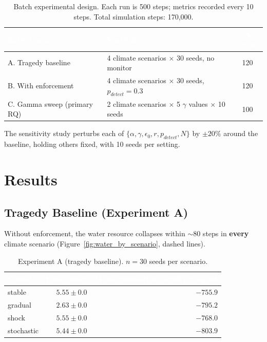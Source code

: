 \documentclass[12pt, a4paper]{article}
\begin{document}
\begin{table}[H]
    \centering
    \renewcommand{\arraystretch}{1.4}
    \small
    \begin{tabular}{|l|p{8cm}|c|}
        \hline
        \rowcolor{nutDark} \textcolor{white}{\textbf{Experiment}} & \textcolor{white}{\textbf{Variables}} & \textcolor{white}{\textbf{N runs}} \\ \hline
        A. Tragedy baseline & 4 climate scenarios $\times$ 30 seeds, no monitor & 120 \\ \hline
        B. With enforcement & 4 climate scenarios $\times$ 30 seeds, $p_{detect}{=}0.3$ & 120 \\ \hline
        C. Gamma sweep (primary RQ) & 2 climate scenarios $\times$ 5 $\gamma$ values $\times$ 10 seeds & 100 \\ \hline
    \end{tabular}
    \caption{Batch experimental design. Each run is 500 steps; metrics recorded every 10 steps. Total simulation steps: 170{,}000.}
\end{table}

The sensitivity study perturbs each of
$\{\alpha, \gamma, \epsilon_0, r, p_{detect}, N\}$ by $\pm 20\%$ around the
baseline, holding others fixed, with 10 seeds per setting.

\section{Results}

\subsection{Tragedy Baseline (Experiment A)}

Without enforcement, the water resource collapses within ${\sim}80$ steps in
\textbf{every} climate scenario (Figure~\ref{fig:water_by_scenario}, dashed
lines).

\begin{table}[H]
    \centering
    \renewcommand{\arraystretch}{1.3}
    \begin{tabular}{|l|r|r|}
        \hline
        \rowcolor{nutDark}
        \textcolor{white}{\textbf{Climate}} &
        \textcolor{white}{\textbf{Final water}} &
        \textcolor{white}{\textbf{Mean cumulative payoff per agent}} \\ \hline
        stable     & $5.55 \pm 0.0$ & $-755.9$ \\ \hline
        gradual    & $2.63 \pm 0.0$ & $-795.2$ \\ \hline
        shock      & $5.55 \pm 0.0$ & $-768.0$ \\ \hline
        stochastic & $5.44 \pm 0.0$ & $-803.9$ \\ \hline
    \end{tabular}
    \caption{Experiment A (tragedy baseline). $n = 30$ seeds per scenario.}
\end{table}
\end{document}
